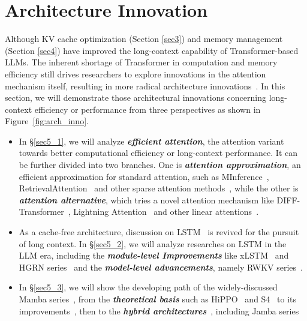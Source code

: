 \section{Architecture Innovation}\label{sec5}

Although KV cache optimization (Section \ref{sec3}) and memory management (Section \ref{sec4}) have improved the long-context capability of Transformer-based LLMs. The inherent shortage of Transformer in computation and memory efficiency still drives researchers to explore innovations in the attention mechanism itself, resulting in more radical architecture innovations~\citep{jiang2024minference,ye2024differential,peng2023rwkv,gu2023mamba}. In this section, we will demonstrate those architectural innovations concerning long-context efficiency or performance from three perspectives as shown in Figure~\ref{fig:arch_inno}.
\begin{itemize}
    \item In \S\ref{sec5_1}, we will analyze \textbf{\textit{efficient attention}}, the attention variant towards better computational efficiency or long-context performance. It can be further divided into two branches. One is \textbf{\textit{attention approximation}}, an efficient approximation for standard attention, such as MInference~\citep{jiang2024minference}, RetrievalAttention~\citep{liu2024retrievalattention} and other sparse attention methods~\citep{yang2024post,zhu2024sampleattention}, while the other is \textbf{\textit{attention alternative}}, which tries a novel attention mechanism like DIFF-Transformer~\citep{ye2024differential}, Lightning Attention~\citep{qin2024various,qin2024lightning} and other linear attentions~\citep{katharopoulos2020transformers}.
    \item As a cache-free architecture, discussion on LSTM~\citep{schmidhuber1997long} is revived for the pursuit of long context. In \S\ref{sec5_2}, we will analyze researches on LSTM in the LLM era, including the \textbf{\textit{module-level Improvements}} like xLSTM~\citep{beck2024xlstm} and HGRN series~\citep{qin2024hierarchically,qin2024hgrn2} and the \textbf{\textit{model-level advancements}}, namely RWKV series~\citep{peng2023rwkv,peng2024eagle,choe2024rwkv}.
    \item In \S\ref{sec5_3}, we will show the developing path of the widely-discussed Mamba series~\citep{gu2023mamba,daotransformers,wang2024mamba}, from the \textbf{\textit{theoretical basis}} such as HiPPO~\citep{gu2020hippo} and S4~\citep{gu2021efficiently} to its improvements~\citep{ben2024decimamba,yuan2024remamba}, then to the \textbf{\textit{hybrid architectures}}~\citep{dong2024hymba,akhauri2024attamba}, including Jamba series~\citep{team2024jamba,lieber2024jamba}
\end{itemize}


